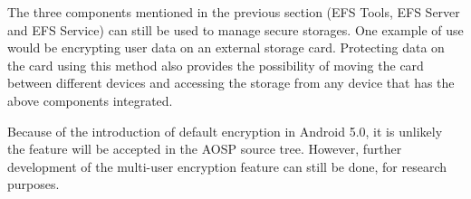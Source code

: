 The three components mentioned in the previous section (EFS Tools, EFS Server and EFS Service) can still be used to manage secure storages. One example of use would be encrypting user data on an external storage card. Protecting data on the card using this method also provides the possibility of moving the card between different devices and accessing the storage from any device that has the above components integrated.

Because of the introduction of default encryption in Android 5.0, it is unlikely the feature will be accepted in the AOSP source tree. However, further development of the multi-user encryption feature can still be done, for research purposes.
